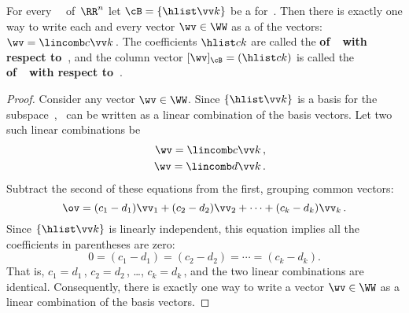 \begin{theorem} \label{thm:ssbc} 
For every ~\WW\ of~\(\RR^n\) let \(\cB=\{\hlist\vv k\}\) be a  for~\WW.  
Then there is exactly one way to write each and every vector \(\wv\in\WW\) as a  of the  vectors: \(\wv=\lincomb c\vv k\)\,.
The coefficients \(\hlist ck\) are called the \textbf{ of~\wv\ with respect to~\cB}, and the column vector \([\wv]_{\cB}=(\hlist ck)\) is called the \textbf{ of~\wv\ with respect to~\cB}.
\end{theorem}
\begin{proof}  
Consider any vector \(\wv\in\WW\).
Since \(\{\hlist\vv k\}\) is a basis for the subspace~\WW, \wv~can be written as a linear combination of the basis vectors. 
Let two such linear combinations be
\begin{eqnarray*}&&
\wv=\lincomb c\vv k\,,
\\&&
\wv=\lincomb d\vv k\,.
\end{eqnarray*}
Subtract the second of these equations from the first, grouping common vectors:
\begin{equation*}
\ov=(c_1-d_1)\vv_1+(c_2-d_2)\vv_2+\cdots+(c_k-d_k)\vv_k\,.
\end{equation*}
Since \(\{\hlist\vv k\}\) is linearly independent, this equation implies all the coefficients in parentheses are zero:
\begin{equation*}
0=(c_1-d_1)=(c_2-d_2)=\cdots=(c_k-d_k).
\end{equation*}
That is, \(c_1=d_1\)\,, \(c_2=d_2\)\,, \ldots, \(c_k=d_k\)\,, and the two linear combinations are identical.
Consequently, there is exactly one way to write a vector \(\wv\in\WW\) as a {linear combination} of the {basis} vectors.
\end{proof}


